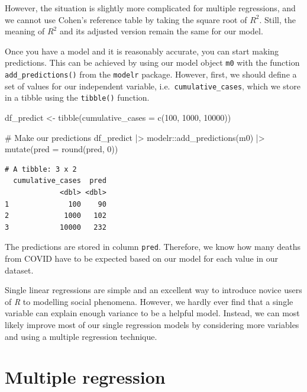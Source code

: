 \documentclass[
  letterpaper,
]{krantz}
\makeatletter
\newenvironment{Shaded}{\begin{snugshade}}{\end{snugshade}}
\newcommand{\AttributeTok}[1]{\textcolor[rgb]{0.40,0.45,0.13}{#1}}
\newcommand{\CommentTok}[1]{\textcolor[rgb]{0.37,0.37,0.37}{#1}}
\newcommand{\DecValTok}[1]{\textcolor[rgb]{0.68,0.00,0.00}{#1}}
\newcommand{\FunctionTok}[1]{\textcolor[rgb]{0.28,0.35,0.67}{#1}}
\newcommand{\NormalTok}[1]{\textcolor[rgb]{0.00,0.23,0.31}{#1}}
\newcommand{\OtherTok}[1]{\textcolor[rgb]{0.00,0.23,0.31}{#1}}
\newcommand{\SpecialCharTok}[1]{\textcolor[rgb]{0.37,0.37,0.37}{#1}}
\newenvironment{kframe}{%
\medskip{}
\setlength{\fboxsep}{.8em}
 \def\at@end@of@kframe{}%
 \ifinner\ifhmode%
  \def\at@end@of@kframe{\end{minipage}}%
  \begin{minipage}{\columnwidth}%
 \fi\fi%
 \def\FrameCommand##1{\hskip\@totalleftmargin \hskip-\fboxsep
 \colorbox{shadecolor}{##1}\hskip-\fboxsep
     \hskip-\linewidth \hskip-\@totalleftmargin \hskip\columnwidth}%
 \MakeFramed {\advance\hsize-\width
   \@totalleftmargin\z@ \linewidth\hsize
   \@setminipage}}%
 {\par\unskip\endMakeFramed%
 \at@end@of@kframe}
\renewenvironment{Shaded}{\begin{kframe}}{\end{kframe}}
\makeatother
\begin{document}
However, the situation is slightly more complicated for multiple
regressions, and we cannot use Cohen's reference table by taking the
square root of \(R^2\). Still, the meaning of \(R^2\) and its adjusted
version remain the same for our model.

Once you have a model and it is reasonably accurate, you can start
making predictions. This can be achieved by using our model object
\texttt{m0} with the function \texttt{add\_predictions()} from the
\texttt{modelr} package. However, first, we should define a set of
values for our independent variable, i.e.~\texttt{cumulative\_cases},
which we store in a tibble using the \texttt{tibble()} function.

\begin{Shaded}
\begin{Highlighting}[]
\NormalTok{df\_predict }\OtherTok{\textless{}{-}}
  \FunctionTok{tibble}\NormalTok{(}\AttributeTok{cumulative\_cases =} \FunctionTok{c}\NormalTok{(}\DecValTok{100}\NormalTok{, }\DecValTok{1000}\NormalTok{, }\DecValTok{10000}\NormalTok{))}

\CommentTok{\# Make our predictions}
\NormalTok{df\_predict }\SpecialCharTok{|\textgreater{}}
\NormalTok{  modelr}\SpecialCharTok{::}\FunctionTok{add\_predictions}\NormalTok{(m0) }\SpecialCharTok{|\textgreater{}}
  \FunctionTok{mutate}\NormalTok{(}\AttributeTok{pred =} \FunctionTok{round}\NormalTok{(pred, }\DecValTok{0}\NormalTok{))}
\end{Highlighting}
\end{Shaded}

\begin{verbatim}
# A tibble: 3 x 2
  cumulative_cases  pred
             <dbl> <dbl>
1              100    90
2             1000   102
3            10000   232
\end{verbatim}

The predictions are stored in column \texttt{pred}. Therefore, we know
how many deaths from COVID have to be expected based on our model for
each value in our dataset.

Single linear regressions are simple and an excellent way to introduce
novice users of \emph{R} to modelling social phenomena. However, we
hardly ever find that a single variable can explain enough variance to
be a helpful model. Instead, we can most likely improve most of our
single regression models by considering more variables and using a
multiple regression technique.

\section{Multiple regression}\label{sec-multiple-regression}
\end{document}
